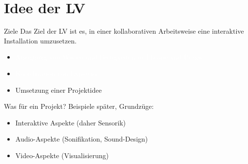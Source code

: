 \section{Idee der LV}
 \frame{\sectionpage}

\begin{frame}{Ziele}
Das Ziel der LV ist es, in einer kollaborativen Arbeitsweise eine interaktive Installation umzusetzen.

\begin{itemize}
    \item \textcolor{white}{Aneignung von Wissen und Fertigkeiten in Theorie und Praxis}
    \item \textcolor{white}{Koordination von Expertise}
    \item \textcolor{red2}{Umsetzung einer Projektidee}
\end{itemize}
    
\end{frame}

\begin{frame}{Was für ein Projekt?}
Beispiele später, Grundzüge:

\begin{itemize}
    \item Interaktive Aspekte (daher Sensorik)
    \item Audio-Aspekte (Sonifikation, Sound-Design)
    \item Video-Aspekte (Visualisierung)
\end{itemize}

\end{frame}






    



    
